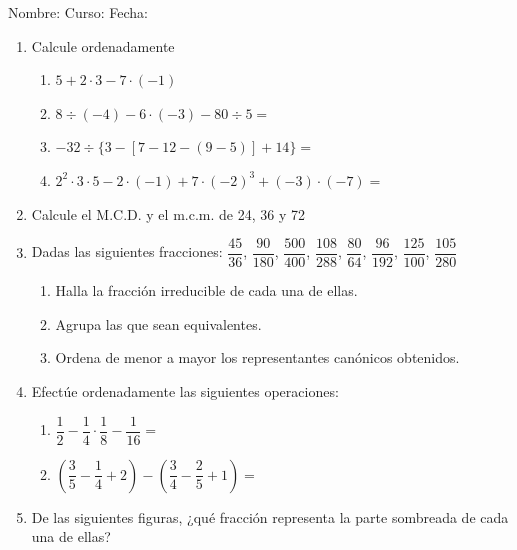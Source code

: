 \documentclass[fleqn]{article}
\newcommand{\LineaNombre}{%
\par
\vspace{\baselineskip}
Nombre:\hrulefill \; Curso: \underline{\hspace*{48pt}} \; Fecha: \underline{\hspace*{2.5cm}} \relax
\par}
\begin{document}
\LineaNombre
\begin{enumerate}
 \item Calcule ordenadamente
 \begin{enumerate}
 \item $5+2\cdot 3-7\cdot (-1)$\noanswer[.2in]
 \item $8\div (-4)-6\cdot (-3)-80\div 5 =$\noanswer[.2in]
   \item $-32\div \{3-[7-12-(9-5)]+14\}=$\noanswer[.2in]
 \item $2^{2}\cdot 3\cdot 5-2\cdot (-1)+7\cdot (-2)^{3}+(-3)\cdot (-7)=$\noanswer[.2in]
 \end{enumerate}
 \item Calcule el M.C.D. y el m.c.m. de 24, 36 y 72 \noanswer[.75in]
 \item Dadas las siguientes fracciones: $\dfrac{45}{36}$, $\dfrac{90}{180}$, $\dfrac{500}{400}$, $\dfrac{108}{288}$, $\dfrac{80}{64}$, $\dfrac{96}{192}$, $\dfrac{125}{100}$, $\dfrac{105}{280}$
 \begin{enumerate}
 \item Halla la fracción irreducible de cada una de ellas.
 \item Agrupa las que sean equivalentes.
 \item Ordena de menor a mayor los representantes canónicos obtenidos.
 \end{enumerate}
 \noanswer
  \newpage
 \item Efectúe ordenadamente las siguientes operaciones:
 \begin{enumerate}
 \item $\dfrac{1}{2}-\dfrac{1}{4}\cdot \dfrac{1}{8}-\dfrac{1}{16}=$\noanswer[.5in]
 \item $\left(\dfrac{3}{5}-\dfrac{1}{4}+2\right)-\left(\dfrac{3}{4}-\dfrac{2}{5}+1\right)=$\noanswer[.5in]
 \end{enumerate}
 \item De las siguientes figuras, ¿qué fracción representa la parte sombreada de cada una de ellas?
 \begin{enumerate}
\end{enumerate}
\end{enumerate}
\end{document}
